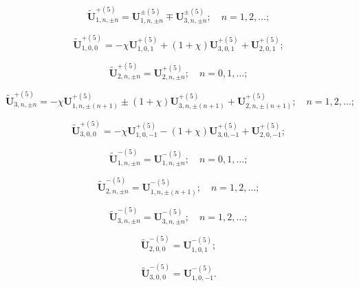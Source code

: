\begin{equation}\label{eq:1:90a}
\mathbf{\tilde U}_{1,n,\pm n}^{+(5)}=\mathbf{U}_{1,n,\pm n}^{\pm(5)}\mp\mathbf{U}_{3,n,\pm n}^{\pm(5)};\quad n=1,2,\dots;
\end{equation}

\begin{equation}\label{eq:1:91a}
\mathbf{\tilde U}_{1,0,0}^{+(5)}=-\chi\mathbf{U}_{1,0,1}^{+(5)}+(1+\chi)\mathbf{U}_{3,0,1}^{+(5)}+\mathbf{U}_{2,0,1}^{+(5)};
\end{equation}

\begin{equation}\label{eq:1:92a}
\mathbf{\tilde U}_{2,n,\pm n}^{+(5)}=\mathbf{U}_{2,n,\pm n}^{+(5)};\quad n=0,1,\dots;
\end{equation}

\begin{equation}\label{eq:1:93a}
\mathbf{\tilde U}_{3,n,\pm n}^{+(5)}=-\chi\mathbf{U}_{1,n,\pm (n+1)}^{+(5)}\pm(1+\chi)\mathbf{U}_{3,n,\pm (n+1)}^{+(5)}+\mathbf{U}_{2,n,\pm (n+1)}^{+(5)};\quad n=1,2,\dots;
\end{equation}

\begin{equation}\label{eq:1:94a}
\mathbf{\tilde U}_{3,0,0}^{+(5)}=-\chi\mathbf{U}_{1,0,-1}^{+(5)}-(1+\chi)\mathbf{U}_{3,0,-1}^{+(5)}+\mathbf{U}_{2,0,-1}^{+(5)};
\end{equation}

\begin{equation}\label{eq:1:95a}
\mathbf{\tilde U}_{1,n,\pm n}^{-(5)}=\mathbf{U}_{1,n,\pm n}^{-(5)};\quad n=0,1,\dots;
\end{equation}

\begin{equation}\label{eq:1:96a}
\mathbf{\tilde U}_{2,n,\pm n}^{-(5)}=\mathbf{U}_{1,n,\pm (n+1)}^{-(5)};\quad n=1,2,\dots;
\end{equation}

\begin{equation}\label{eq:1:97a}
\mathbf{\tilde U}_{3,n,\pm n}^{-(5)}=\mathbf{U}_{3,n,\pm n}^{-(5)};\quad n=1,2,\dots;
\end{equation}

\begin{equation}\label{eq:1:98a}
\mathbf{\tilde U}_{2,0,0}^{-(5)}=\mathbf{U}_{1,0,1}^{-(5)};
\end{equation}

\begin{equation}\label{eq:1:99a}
\mathbf{\tilde U}_{3,0,0}^{-(5)}=\mathbf{U}_{1,0,-1}^{-(5)}.
\end{equation}

